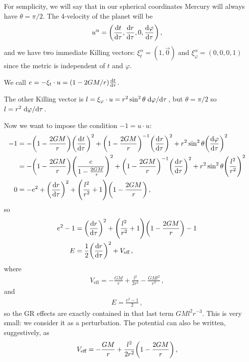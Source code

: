 \documentclass[main.tex]{subfiles}
\begin{document}
For semplicity, we will say that in our spherical coordinates Mercury will always have \(\theta = \pi /2\).
The 4-velocity of the planet will be 
%
\begin{align}
  u^{\alpha } = \qty(\dv{t}{\tau }, \dv{r}{\tau }, 0, \dv{\varphi }{\tau })
\,,
\end{align}
%
and we have two immediate Killing vectors: \(\xi^{\alpha }_t= (1, \vec{0} )\) and \(\xi^{\alpha }_\varphi = (0,0,0, 1)\) since the metric is independent of \(t\) and \(\varphi\).

We call \(e = - \xi_t \cdot u = (1 - 2GM/r) \dv{t}{\tau }\).

The other Killing vector is \(l = \xi_\varphi \cdot u  =  r^2 \sin^2 \theta \dv*{\varphi }{\tau }\), but \(\theta = \pi /2\) so \(l = r^2 \dv*{\varphi }{\tau }\). 

Now we want to impose the condition \(-1 = u \cdot u\): 
%
\begin{subequations}
\begin{align}
  -1 &=
  - \qty(1 - \frac{2GM}{r}) \qty(\dv[]{t}{\tau })^2
  + \qty(1 - \frac{2GM}{r})^{-1} \qty(\dv[]{r}{\tau })^2
  + r^2 \sin^2 \theta \qty(\dv{\varphi }{\tau })^2  \\
  &=
  - \qty(1 - \frac{2GM}{r}) \qty(\frac{e}{1 - \frac{2GM}{r}})^2
  + \qty(1 - \frac{2GM}{r})^{-1} \qty(\dv[]{r}{\tau })^2
  + r^2 \sin^2 \theta \qty(\frac{l^2}{r^2})^2  \\
  0&= - e^2 + \qty(\dv{r}{\tau })^2
  + \qty(\frac{l^2}{r^2}+1) \qty(1 - \frac{2GM}{r})
\,,
\end{align}
\end{subequations}
%
so 
%
\begin{subequations}
\begin{align}
  e^2-1 &= \qty(\dv{r}{\tau })^2 + \qty(\frac{l^2}{r^2} +1)
  \qty(1 - \frac{2GM}{r}) - 1 \\
  E &=  \frac{1}{2} \qty(\dv{r}{\tau })^2
  + V _{\text{eff}}
\,,
\end{align}
\end{subequations}
%
where 
%
\begin{align}
  V_{\text{eff}} = - \frac{GM}{r} + \frac{l^2}{2 r^2} - \frac{GMl^2}{r^3}
\,,
\end{align}
%
and 
%
\begin{align}
  E = \frac{e^2-1}{2}
\,,
\end{align}
%
so the GR effects are exactly contained in that last term \(GMl^2r^{-3}\). This is very small: we consider it as a perturbation.
The potential can also be written, suggestively, as 
%
\begin{align}
V _{\text{eff}} = - \frac{GM}{r} + \frac{l^2}{2r^2} \qty(1 - \frac{2GM}{r})
\,,
\end{align}
%
\end{document}
